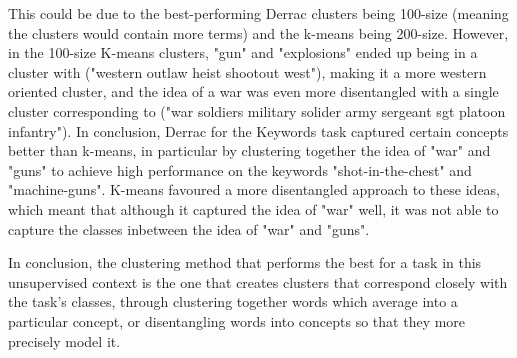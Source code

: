This could be due to the best-performing Derrac clusters being 100-size (meaning the clusters would contain more terms) and the k-means being 200-size. However, in the 100-size K-means clusters, "gun" and "explosions" ended up being in a cluster with ("western outlaw heist shootout west"), making it a more western oriented cluster, and the idea of a war was even more disentangled with a single cluster corresponding to ("war soldiers military solider army sergeant sgt platoon infantry"). In conclusion, Derrac for the Keywords task captured certain concepts better than k-means, in particular by clustering together the idea of "war" and "guns" to achieve high performance on the keywords "shot-in-the-chest" and "machine-guns". K-means favoured a more disentangled approach to these ideas, which meant that although it captured the idea of "war" well, it was not able to capture the classes inbetween the idea of "war" and "guns".

In conclusion, the clustering method that performs the best for a task in this unsupervised context is the one that creates clusters that correspond closely with the task's classes, through clustering together words which average into a particular concept, or disentangling words into concepts so that they more precisely model it.





